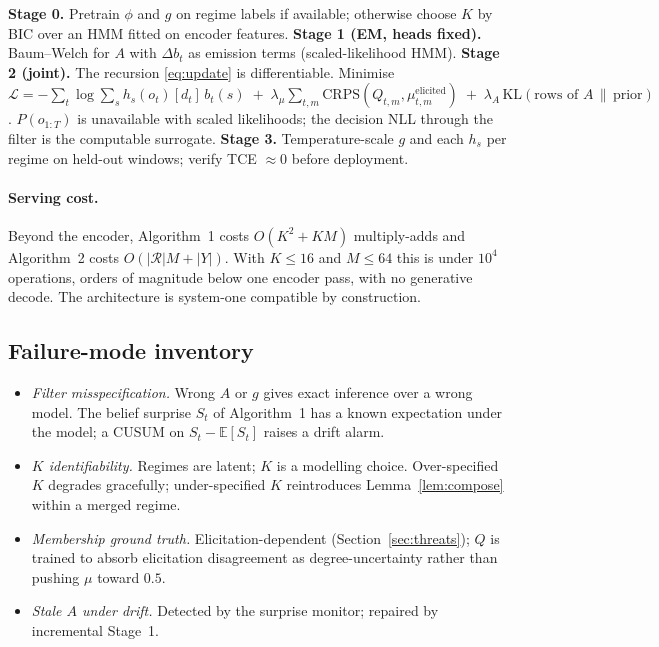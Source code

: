 \documentclass[11pt,a4paper]{article}
\numberwithin{equation}{section}
\theoremstyle{plain}
\theoremstyle{definition}
\theoremstyle{remark}
\newcommand{\E}{\mathbb{E}}
\begin{document}
\begin{algorithm}[H]
\caption{Training}
\begin{algorithmic}[1]
\State \textbf{Stage 0.} Pretrain $\phi$ and $g$ on regime labels if available; otherwise choose $K$ by BIC over an HMM fitted on encoder features.
\State \textbf{Stage 1 (EM, heads fixed).} Baum--Welch for $A$ with $\Delta b_t$ as emission terms (scaled-likelihood HMM).
\State \textbf{Stage 2 (joint).} The recursion \eqref{eq:update} is differentiable. Minimise
\Statex \hspace{2em} $\mathcal L=-\sum_t\log\sum_s h_s(o_t)[d_t]\,b_t(s)\;+\;\lambda_\mu\sum_{t,m}\mathrm{CRPS}(Q_{t,m},\mu^{\mathrm{elicited}}_{t,m})\;+\;\lambda_A\,\mathrm{KL}(\text{rows of }A\,\|\,\text{prior})$.
\Statex \hspace{2em} $P(o_{1:T})$ is unavailable with scaled likelihoods; the decision NLL through the filter is the computable surrogate.
\State \textbf{Stage 3.} Temperature-scale $g$ and each $h_s$ per regime on held-out windows; verify TCE $\approx0$ before deployment.
\end{algorithmic}
\end{algorithm}

\paragraph{Serving cost.} Beyond the encoder, Algorithm~1 costs $O(K^2+KM)$ multiply-adds and Algorithm~2 costs $O(|\mathcal R|M+|Y|)$. With $K\le16$ and $M\le64$ this is under $10^4$ operations, orders of magnitude below one encoder pass, with no generative decode. The architecture is system-one compatible by construction.

\subsection{Failure-mode inventory}
\begin{itemize}[leftmargin=2em]
\item \emph{Filter misspecification.} Wrong $A$ or $g$ gives exact inference over a wrong model. The belief surprise $S_t$ of Algorithm~1 has a known expectation under the model; a CUSUM on $S_t-\E[S_t]$ raises a drift alarm.
\item \emph{$K$ identifiability.} Regimes are latent; $K$ is a modelling choice. Over-specified $K$ degrades gracefully; under-specified $K$ reintroduces Lemma~\ref{lem:compose} within a merged regime.
\item \emph{Membership ground truth.} Elicitation-dependent (Section~\ref{sec:threats}); $Q$ is trained to absorb elicitation disagreement as degree-uncertainty rather than pushing $\mu$ toward $0.5$.
\item \emph{Stale $A$ under drift.} Detected by the surprise monitor; repaired by incremental Stage~1.
\end{itemize}
\end{document}
